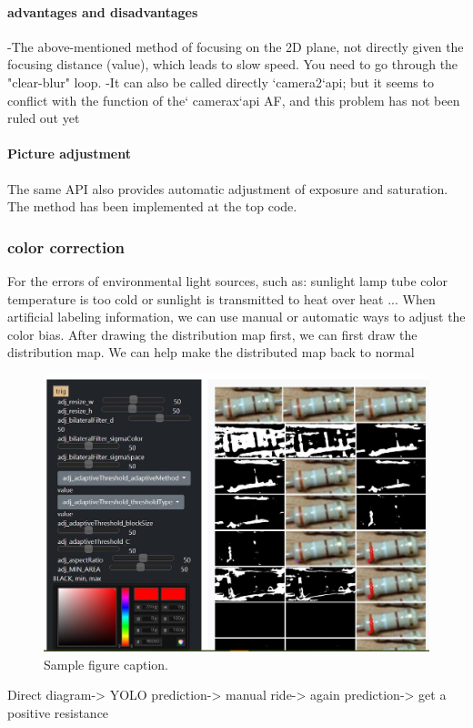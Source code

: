 \documentclass{article}
\begin{document}
\paragraph{advantages and disadvantages}

-The above-mentioned method of focusing on the 2D plane, not directly given the focusing distance (value), which leads to slow speed. You need to go through the "clear-blur" loop.
-It can also be called directly `camera2`api; but it seems to conflict with the function of the` camerax`api AF, and this problem has not been ruled out yet

\paragraph{Picture adjustment}

The same API also provides automatic adjustment of exposure and saturation. The method has been implemented at the top code.
\subsubsection{color correction}
For the errors of environmental light sources, such as: sunlight lamp tube color temperature is too cold or sunlight is transmitted to heat over heat ... When artificial labeling information, we can use manual or automatic ways to adjust the color bias. After drawing the distribution map first, we can first draw the distribution map. We can help make the distributed map back to normal
\begin{figure}
	\centering
	\includegraphics[width=0.7\linewidth]{CsXuTh9.jpg}
	\caption{Sample figure caption.}
	\label{fig:CsXuTh9}
\end{figure}

Direct diagram-> YOLO prediction-> manual ride-> again prediction-> get a positive resistance
\end{document}
